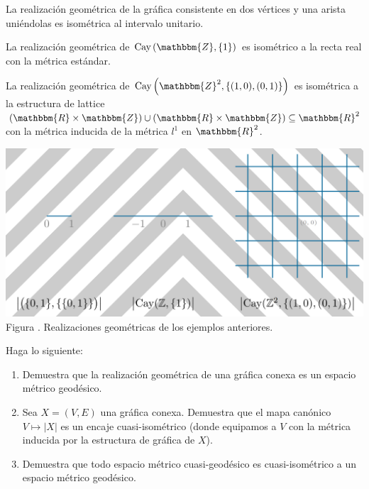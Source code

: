 \documentclass[12pt]{report}
\newcounter{it}
\theoremstyle{largebreak}
\newcommand\abs[1]{\ensuremath{\left|#1\right|}}
\newcommand{\bbm}[1]{\ensuremath{\mathbbm{#1}}}
\newcounter{figcount}
\newcommand{\Cay}[1]{\ensuremath{\textup{Cay}\left(#1\right)}}
\begin{document}
    \begin{exa}
        La realización geométrica de la gráfica consistente en dos vértices y una arista uniéndolas es isométrica al intervalo unitario.
    \end{exa}

    \begin{exa}
        La realización geométrica de $\Cay{\bbm{Z},\left\{1\right\}}$ es isométrico a la recta real con la métrica estándar.
    \end{exa}

    \begin{exa}
        La realización geométrica de $\Cay{\bbm{Z}^2,\left\{(1,0),(0,1) \right\}}$ es isométrica a la estructura de lattice $\left(\bbm{R}\times\bbm{Z}\right)\cup\left(\bbm{R}\times\bbm{Z}\right)\subseteq\bbm{R}^2$ con la métrica inducida de la métrica $l^1$ en $\bbm{R}^2$.
    \end{exa}

    \begin{minipage}{\textwidth}
        \begin{center}
            \includegraphics[scale=0.3]{images/realizaciones.png}\\
            Figura \thefigcount. Realizaciones geométricas de los ejemplos anteriores.
        \end{center}
    \end{minipage}    

    \begin{excer}
        Haga lo siguiente:
        \begin{enumerate}[label = \textit{(\arabic*)}]
            \item Demuestra que la realización geométrica de una gráfica conexa es un espacio métrico geodésico.
            \item Sea $X=(V,E)$ una gráfica conexa. Demuestra que el mapa canónico $V\mapsto\abs{X}$ es un encaje cuasi-isométrico (donde equipamos a $V$ con la métrica inducida por la estructura de gráfica de $X$).
            \item Demuestra que todo espacio métrico cuasi-geodésico es cuasi-isométrico a un espacio métrico geodésico.
        \end{enumerate}
    \end{excer}
\end{document}
